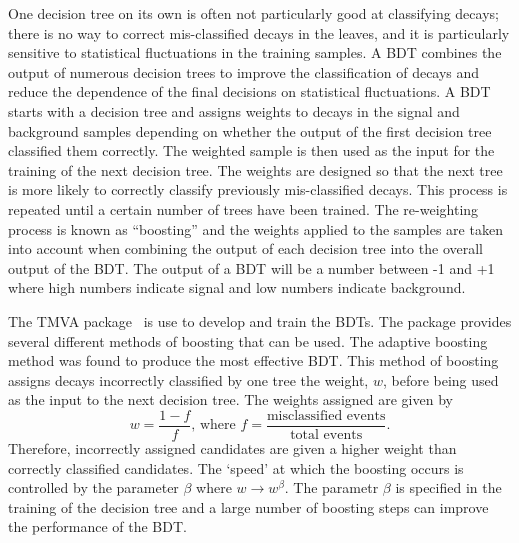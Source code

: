 One decision tree on its own is often not particularly good at classifying decays; there is no way to correct mis-classified decays in the leaves, and it is particularly sensitive to statistical fluctuations in the training samples. A BDT combines the output of numerous decision trees to improve the classification of decays and reduce the dependence of the final decisions on statistical fluctuations. A BDT starts with a decision tree and assigns weights to decays in the signal and background samples depending on whether the output of the first decision tree classified them correctly. The weighted sample is then used as the input for the training of the next decision tree. The weights are designed so that the next tree is more likely to correctly classify previously mis-classified decays. This process is repeated until a certain number of trees have been trained. The re-weighting process is known as ``boosting'' and the weights applied to the samples are taken into account when combining the output of each decision tree into the overall output of the BDT. The output of a BDT will be a number between -1 and +1 where high numbers indicate signal and low numbers indicate background.


The TMVA package~\cite{Hocker:2007ht} is use to develop and train the BDTs. The package provides several different methods of boosting that can be used. The adaptive boosting method was found to produce the most effective BDT.
This method of boosting assigns decays incorrectly classified by one tree the weight, $w$, before being used as the input to the next decision tree. The weights assigned are given by
\begin{equation}
w = \frac{1 - f}{f}\text{, where } f = \frac{\text{misclassified events}}{\text{total events}}.
\end{equation}
Therefore, incorrectly assigned candidates are given a higher weight than correctly classified candidates. The `speed’ at which the boosting occurs is controlled by the parameter $\beta$ where $w \rightarrow w^{\beta}$. The parametr $\beta$ is specified in the training of the decision tree and a large number of boosting steps can improve the performance of the BDT.

